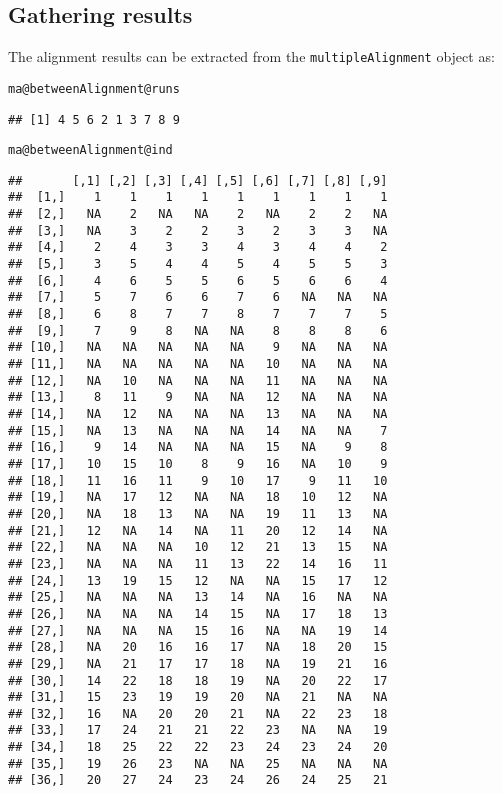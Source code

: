 \documentclass{article}\usepackage[]{graphicx}\usepackage[]{color}
\makeatletter
\newcommand{\hlopt}[1]{\textcolor[rgb]{0,0,0}{#1}}%
\newcommand{\hlstd}[1]{\textcolor[rgb]{0.345,0.345,0.345}{#1}}%
\newcommand{\hlkwc}[1]{\textcolor[rgb]{0.333,0.667,0.333}{#1}}%
\newenvironment{kframe}{%
 \def\at@end@of@kframe{}%
 \ifinner\ifhmode%
  \def\at@end@of@kframe{\end{minipage}}%
  \begin{minipage}{\columnwidth}%
 \fi\fi%
 \def\FrameCommand##1{\hskip\@totalleftmargin \hskip-\fboxsep
 \colorbox{shadecolor}{##1}\hskip-\fboxsep
     \hskip-\linewidth \hskip-\@totalleftmargin \hskip\columnwidth}%
 \MakeFramed {\advance\hsize-\width
   \@totalleftmargin\z@ \linewidth\hsize
   \@setminipage}}%
 {\par\unskip\endMakeFramed%
 \at@end@of@kframe}
\newenvironment{knitrout}{}{} %
\makeatother
\begin{document}
\subsection{Gathering results}
The alignment results can be extracted from the \texttt{multipleAlignment}
object as: 
\begin{knitrout}
\color{fgcolor}\begin{kframe}
\begin{alltt}
\hlstd{ma}\hlopt{@}\hlkwc{betweenAlignment}\hlopt{@}\hlkwc{runs}
\end{alltt}
\begin{verbatim}
## [1] 4 5 6 2 1 3 7 8 9
\end{verbatim}
\begin{alltt}
\hlstd{ma}\hlopt{@}\hlkwc{betweenAlignment}\hlopt{@}\hlkwc{ind}
\end{alltt}
\begin{verbatim}
##       [,1] [,2] [,3] [,4] [,5] [,6] [,7] [,8] [,9]
##  [1,]    1    1    1    1    1    1    1    1    1
##  [2,]   NA    2   NA   NA    2   NA    2    2   NA
##  [3,]   NA    3    2    2    3    2    3    3   NA
##  [4,]    2    4    3    3    4    3    4    4    2
##  [5,]    3    5    4    4    5    4    5    5    3
##  [6,]    4    6    5    5    6    5    6    6    4
##  [7,]    5    7    6    6    7    6   NA   NA   NA
##  [8,]    6    8    7    7    8    7    7    7    5
##  [9,]    7    9    8   NA   NA    8    8    8    6
## [10,]   NA   NA   NA   NA   NA    9   NA   NA   NA
## [11,]   NA   NA   NA   NA   NA   10   NA   NA   NA
## [12,]   NA   10   NA   NA   NA   11   NA   NA   NA
## [13,]    8   11    9   NA   NA   12   NA   NA   NA
## [14,]   NA   12   NA   NA   NA   13   NA   NA   NA
## [15,]   NA   13   NA   NA   NA   14   NA   NA    7
## [16,]    9   14   NA   NA   NA   15   NA    9    8
## [17,]   10   15   10    8    9   16   NA   10    9
## [18,]   11   16   11    9   10   17    9   11   10
## [19,]   NA   17   12   NA   NA   18   10   12   NA
## [20,]   NA   18   13   NA   NA   19   11   13   NA
## [21,]   12   NA   14   NA   11   20   12   14   NA
## [22,]   NA   NA   NA   10   12   21   13   15   NA
## [23,]   NA   NA   NA   11   13   22   14   16   11
## [24,]   13   19   15   12   NA   NA   15   17   12
## [25,]   NA   NA   NA   13   14   NA   16   NA   NA
## [26,]   NA   NA   NA   14   15   NA   17   18   13
## [27,]   NA   NA   NA   15   16   NA   NA   19   14
## [28,]   NA   20   16   16   17   NA   18   20   15
## [29,]   NA   21   17   17   18   NA   19   21   16
## [30,]   14   22   18   18   19   NA   20   22   17
## [31,]   15   23   19   19   20   NA   21   NA   NA
## [32,]   16   NA   20   20   21   NA   22   23   18
## [33,]   17   24   21   21   22   23   NA   NA   19
## [34,]   18   25   22   22   23   24   23   24   20
## [35,]   19   26   23   NA   NA   25   NA   NA   NA
## [36,]   20   27   24   23   24   26   24   25   21
\end{verbatim}
\end{kframe}
\end{knitrout}
\end{document}
